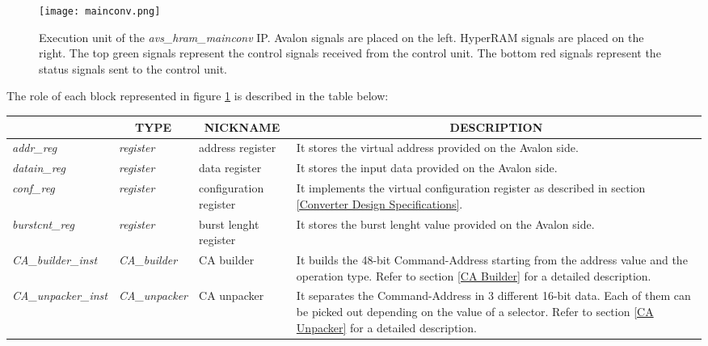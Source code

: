 \documentclass[10pt, english, a4paper, titlepage, oneside]{book}
\begin{document}
\vspace{1mm}
\begin{figure}[H]
    \centering
    \captionsetup{width=16cm}
    \texttt{[image: mainconv.png]}
    \caption{\centering Execution unit of the \textit{avs\_hram\_mainconv} IP. Avalon signals are placed on the left. HyperRAM signals are placed on the right. The top green signals represent the control signals received from the control unit. The bottom red signals represent the status signals sent to the control unit.}
    \label{mainconv}
\end{figure}
\vspace{6mm}
\noindent The role of each block represented in figure \ref{mainconv} is described in the table below:
\vspace{4mm}
\renewcommand{\arraystretch}{1.5}
\begin{table}[H]
    \begin{center}
        \begin{tabular}{|p{3cm}|p{4cm}|p{3.5cm}|p{6cm}|}
            \hline
            \rowcolor{lightgray} \multicolumn{1}{|c|}{NAME} & \multicolumn{1}{|c|}{TYPE} & \multicolumn{1}{|c|}{NICKNAME} & \multicolumn{1}{|c|}{DESCRIPTION} \\
            \hline
            \textit{addr\_reg} & \textit{register} & address register & It stores the virtual address provided on the Avalon side. \\
            \hline
            \textit{datain\_reg} & \textit{register} & data register & It stores the input data provided on the Avalon side. \\
            \hline
            \textit{conf\_reg} & \textit{register} & configuration register & It implements the virtual configuration register as described in section \ref{Converter Design Specifications}. \\
            \hline
            \textit{burstcnt\_reg} & \textit{register} & burst lenght register & It stores the burst lenght value provided on the Avalon side. \\
            \hline
            \textit{CA\_builder\_inst} & \textit{CA\_builder} & CA builder & It builds the 48-bit Command-Address starting from the address value and the operation type. Refer to section \ref{CA Builder} for a detailed description. \\
            \hline
            \textit{CA\_unpacker\_inst} & \textit{CA\_unpacker} & CA unpacker & It separates the Command-Address in 3 different 16-bit data. Each of them can be picked out depending on the value of a selector. Refer to section \ref{CA Unpacker} for a detailed description. \\

\end{tabular}
\end{center}
\end{table}
\end{document}
